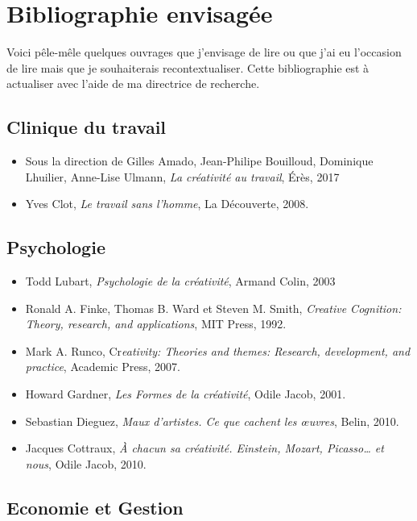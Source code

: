 \documentclass{article}
\begin{document}
\section{Bibliographie envisagée}

Voici pêle-mêle quelques ouvrages que j'envisage de lire ou que j'ai eu l'occasion de lire mais que je souhaiterais recontextualiser. Cette bibliographie est à actualiser avec l'aide de ma directrice de recherche. 

\subsection{Clinique du travail}

\begin{itemize}

\item Sous la direction de Gilles Amado, Jean-Philipe Bouilloud, Dominique Lhuilier, Anne-Lise Ulmann, \textit{La créativité au travail}, Érès, 2017
\item Yves Clot, \textit{Le travail sans l’homme}, La Découverte, 2008.

\end{itemize}

\subsection{Psychologie}

\begin{itemize}

\item Todd Lubart, \textit{Psychologie de la créativité}, Armand Colin, 2003
\item Ronald A. Finke, Thomas B. Ward et Steven M. Smith, \textit{Creative Cognition: Theory, research, and applications}, MIT Press, 1992.
\item Mark A. Runco, Cr\textit{eativity: Theories and themes: Research, development, and practice}, Academic Press, 2007.
\item Howard Gardner, \textit{Les Formes de la créativité}, Odile Jacob, 2001.
\item Sebastian Dieguez, \textit{Maux d’artistes. Ce que cachent les œuvres}, Belin, 2010.
\item Jacques Cottraux, \textit{À chacun sa créativité. Einstein, Mozart, Picasso… et nous}, Odile Jacob, 2010.

\end{itemize}

\subsection{Economie et Gestion}
\end{document}
